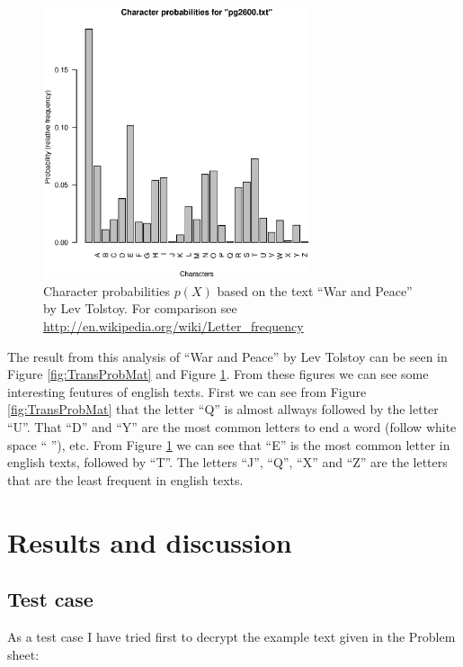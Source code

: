 \documentclass[a4paper, 11pt]{article}
\begin{document}
\begin{figure}[h!]
  \centering
  \includegraphics[width=0.7\textwidth]{char_prob-pg2600-.eps}
  \caption{Character probabilities $p(X)$ based on the text
  ``War and Peace'' by Lev Tolstoy. For comparison see 
  \href{http://en.wikipedia.org/wiki/Letter_frequency}{http://en.wikipedia.org/wiki/Letter\_frequency}}
  \label{fig:CharProb}
\end{figure}

The result from this analysis of ``War and Peace'' by Lev Tolstoy can be
seen in Figure \ref{fig:TransProbMat} and Figure \ref{fig:CharProb}. From
these figures we can see some interesting feutures of english texts. First
we can see from Figure \ref{fig:TransProbMat} that the letter ``Q'' is almost
allways followed by the letter ``U''. That ``D'' and ``Y'' are the most common
letters to end a word (follow white space `` ''), etc. From Figure 
\ref{fig:CharProb} we can see that ``E'' is the most common letter in english
texts, followed by ``T''. The letters ``J'', ``Q'', ``X'' and ``Z'' are the
letters that are the least frequent in english texts.

\section{Results and discussion}

\subsection{Test case}

As a test case I have tried first to decrypt the example text given in the
Problem sheet:
\end{document}

